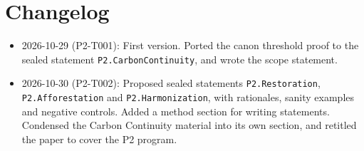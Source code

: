 \documentclass[11pt]{article}
\theoremstyle{definition}
\theoremstyle{remark}
\begin{document}
\section{Changelog}
\begin{itemize}
\item 2026-10-29 (P2-T001): First version. Ported the canon threshold proof to the sealed statement
\texttt{P2.CarbonContinuity}, and wrote the scope statement.
\item 2026-10-30 (P2-T002): Proposed sealed statements \texttt{P2.Restoration}, \texttt{P2.Afforestation} and \texttt{P2.Harmonization},
with rationales, sanity examples and negative controls. Added a method section for writing statements.
Condensed the Carbon Continuity material into its own section, and retitled the paper to cover the P2 program.
\end{itemize}



\end{document}
